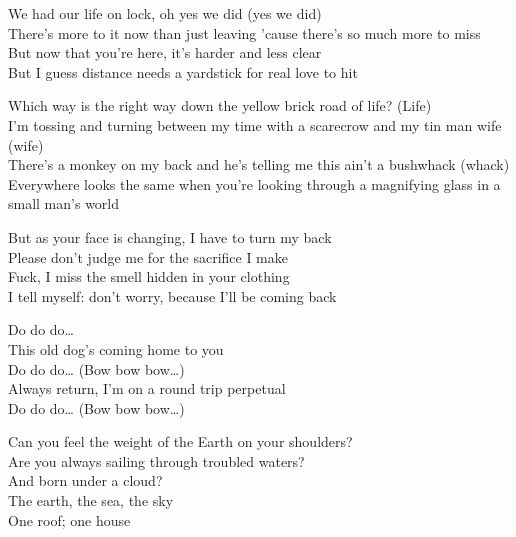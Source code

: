 
We had our life on lock, oh yes we did (yes we did)\\
There's more to it now than just leaving 'cause there's so much more to miss\\
But now that you're here, it's harder and less clear\\
But I guess distance needs a yardstick for real love to hit\\


Which way is the right way down the yellow brick road of life? (Life)\\
I'm tossing and turning between my time with a scarecrow and my tin man wife (wife)\\
There's a monkey on my back and he's telling me this ain't a bushwhack (whack)\\
Everywhere looks the same when you're looking through a magnifying glass in a small man's world\\


But as your face is changing, I have to turn my back\\
Please don't judge me for the sacrifice I make\\
Fuck, I miss the smell hidden in your clothing\\
I tell myself: don't worry, because I'll be coming back\\


Do do do…\\
This old dog's coming home to you\\
Do do do… (Bow bow bow…)\\
Always return, I'm on a round trip perpetual\\
Do do do… (Bow bow bow…)\\




Can you feel the weight of the Earth on your shoulders?\\
Are you always sailing through troubled waters?\\
And born under a cloud?\\
The earth, the sea, the sky\\
One roof; one house\\

